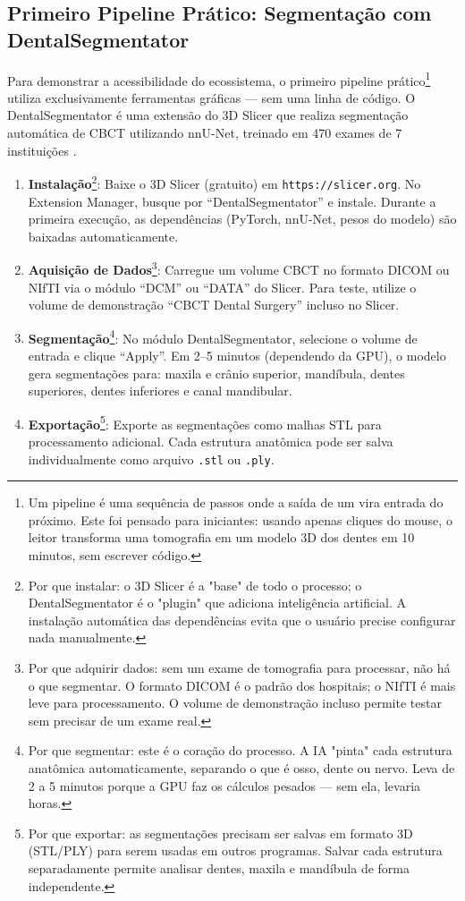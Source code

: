 \subsection{Primeiro Pipeline Prático: Segmentação com DentalSegmentator}

Para demonstrar a acessibilidade do ecossistema, o primeiro pipeline prático\footnote{Um pipeline é uma sequência de passos onde a saída de um vira entrada do próximo. Este foi pensado para iniciantes: usando apenas cliques do mouse, o leitor transforma uma tomografia em um modelo 3D dos dentes em 10 minutos, sem escrever código.} utiliza exclusivamente ferramentas gráficas --- sem uma linha de código. O DentalSegmentator é uma extensão do 3D Slicer que realiza segmentação automática de CBCT utilizando nnU-Net, treinado em 470 exames de 7 instituições \cite{dot2024dental}.

\begin{enumerate}
    \item \textbf{Instalação}\footnote{Por que instalar: o 3D Slicer é a "base" de todo o processo; o DentalSegmentator é o "plugin" que adiciona inteligência artificial. A instalação automática das dependências evita que o usuário precise configurar nada manualmente.}: Baixe o 3D Slicer (gratuito) em \texttt{https://slicer.org}. No Extension Manager, busque por ``DentalSegmentator'' e instale. Durante a primeira execução, as dependências (PyTorch, nnU-Net, pesos do modelo) são baixadas automaticamente.
    
    \item \textbf{Aquisição de Dados}\footnote{Por que adquirir dados: sem um exame de tomografia para processar, não há o que segmentar. O formato DICOM é o padrão dos hospitais; o NIfTI é mais leve para processamento. O volume de demonstração incluso permite testar sem precisar de um exame real.}: Carregue um volume CBCT no formato DICOM ou NIfTI via o módulo ``DCM'' ou ``DATA'' do Slicer. Para teste, utilize o volume de demonstração ``CBCT Dental Surgery'' incluso no Slicer.
    
    \item \textbf{Segmentação}\footnote{Por que segmentar: este é o coração do processo. A IA "pinta" cada estrutura anatômica automaticamente, separando o que é osso, dente ou nervo. Leva de 2 a 5 minutos porque a GPU faz os cálculos pesados --- sem ela, levaria horas.}: No módulo DentalSegmentator, selecione o volume de entrada e clique ``Apply''. Em 2--5 minutos (dependendo da GPU), o modelo gera segmentações para: maxila e crânio superior, mandíbula, dentes superiores, dentes inferiores e canal mandibular.
    
    \item \textbf{Exportação}\footnote{Por que exportar: as segmentações precisam ser salvas em formato 3D (STL/PLY) para serem usadas em outros programas. Salvar cada estrutura separadamente permite analisar dentes, maxila e mandíbula de forma independente.}: Exporte as segmentações como malhas STL para processamento adicional. Cada estrutura anatômica pode ser salva individualmente como arquivo \texttt{.stl} ou \texttt{.ply}.
\end{enumerate}

